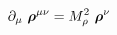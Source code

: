 \begin{equation}
\partial_\mu~\mbox{\boldmath$\rho$}^{\mu\nu}= M_\rho^2 ~\mbox{\boldmath$\rho$}^\nu
\end{equation}

